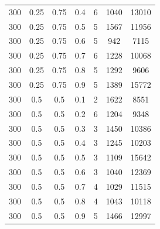 \documentclass[12pt]{report}
\begin{document}
\begin{table}[H]
\begin{center}
\begin{tabular}{|c|c|c|c|c|c|c|}
				300 & 0.25 & 0.75 & 0.4 & 6 & 1040 & 13010 \\
				300 & 0.25 & 0.75 & 0.5 & 5 & 1567 & 11956 \\
				300 & 0.25 & 0.75 & 0.6 & 5 & 942 & 7115 \\
				300 & 0.25 & 0.75 & 0.7 & 6 & 1228 & 10068 \\
				300 & 0.25 & 0.75 & 0.8 & 5 & 1292 & 9606 \\
				300 & 0.25 & 0.75 & 0.9 & 5 & 1389 & 15772 \\
				300 & 0.5 & 0.5 & 0.1 & 2 & 1622 & 8551 \\
				300 & 0.5 & 0.5 & 0.2 & 6 & 1204 & 9348 \\
				300 & 0.5 & 0.5 & 0.3 & 3 & 1450 & 10386 \\
				300 & 0.5 & 0.5 & 0.4 & 3 & 1245 & 10203 \\
				300 & 0.5 & 0.5 & 0.5 & 3 & 1109 & 15642 \\
				300 & 0.5 & 0.5 & 0.6 & 3 & 1040 & 12369 \\
				300 & 0.5 & 0.5 & 0.7 & 4 & 1029 & 11515 \\
				300 & 0.5 & 0.5 & 0.8 & 4 & 1043 & 10118 \\
				300 & 0.5 & 0.5 & 0.9 & 5 & 1466 & 12997 \\
				\hline	
			\end{tabular}
		\end{center}
	\end{table}
\end{document}
